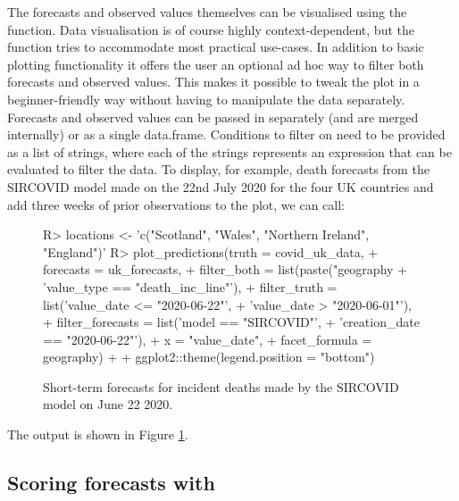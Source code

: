\documentclass[article,shortnames]{jss}
\newcommand{\fct}[1]{\code{#1()}}
\begin{document}
% 
The forecasts and observed values themselves can be visualised using the \fct{plot\_predictions} function. Data visualisation is of course highly context-dependent, but the function tries to accommodate most practical use-cases. In addition to basic plotting functionality it offers the user an optional ad hoc way to filter both forecasts and observed values. This makes it possible to tweak the plot in a beginner-friendly way without having to manipulate the data separately. Forecasts and observed values can be passed in separately (and are merged internally) or as a single data.frame. Conditions to filter on need to be provided as a list of strings, where each of the strings represents an expression that can be evaluated to filter the data. To display, for example, death forecasts from the SIRCOVID model made on the 22nd July 2020 for the four UK countries and add three weeks of prior observations to the plot, we can call: %
\begin{figure}[h!]
\centering
\begin{Schunk}
\begin{Sinput}
R> locations <- 'c("Scotland", "Wales", "Northern Ireland", "England")'
R> plot_predictions(truth = covid_uk_data,
+                   forecasts = uk_forecasts,
+                   filter_both = list(paste("geography %
+                                      'value_type == "death_inc_line"'),
+                   filter_truth = list('value_date <= "2020-06-22"',
+                                       'value_date > "2020-06-01"'), 
+                   filter_forecasts = list('model == "SIRCOVID"', 
+                                           'creation_date == "2020-06-22"'),
+                   x = "value_date",
+                   facet_formula = ~ geography) + 
+    ggplot2::theme(legend.position = "bottom")
\end{Sinput}
\end{Schunk}
\caption{\label{fig:forecast-visualisation} Short-term forecasts for incident deaths made by the SIRCOVID model on June 22 2020.}
\end{figure}
% 
The output is shown in Figure \ref{fig:forecast-visualisation}.

\subsection[Scoring forecasts and obtaining a model ranking]{Scoring forecasts with \fct{eval\_forecasts}}
\end{document}
